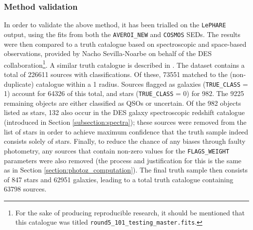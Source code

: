 \subsubsection{Method validation}\label{subsubsection:star_galaxy_validation}
In order to validate the above method, it has been trialled on the \DESVIDEO \texttt{LePHARE} output, using the fits from both the \texttt{AVEROI\_NEW} and \texttt{COSMOS} SEDs. The results were then compared to a truth catalogue based on spectroscopic and space-based observations, provided by Nacho Sevilla-Noarbe on behalf of the DES collaboration\footnote{For the sake of producing reproducible research, it should be mentioned that this catalogue was titled \texttt{round5\_101\_testing\_master.fits}.}. A similar truth catalogue is described in \cite{2018MNRAS.481.5451S}. The dataset contains a total of \num{226 611} sources with classifications. Of these, \num{73 551} matched to the (non-duplicate) \DESVIDEO catalogue within a \SI{1}{\arcsec} radius. Sources flagged as galaxies (\texttt{TRUE\_CLASS} = 1) account for \num{64 326} of this total, and stars (\texttt{TRUE\_CLASS} = 0) for 982. The 9225 remaining objects are either classified as QSOs or uncertain. Of the 982 objects listed as stars, 132 also occur in the DES galaxy spectroscopic redshift catalogue (introduced in Section \ref{subsection:spectra}); these sources were removed from the list of stars in order to achieve maximum confidence that the truth sample indeed consists solely of stars. Finally, to reduce the chance of any biases through faulty photometry, any sources that contain non-zero values for the \texttt{FLAGS\_WEIGHT} parameters were also removed (the process and justification for this is the same as in Section \ref{section:photoz_computation}). The final truth sample then consists of 847 stars and \num{62 951} galaxies, leading to a total truth catalogue containing \num{63 798} sources.\par

